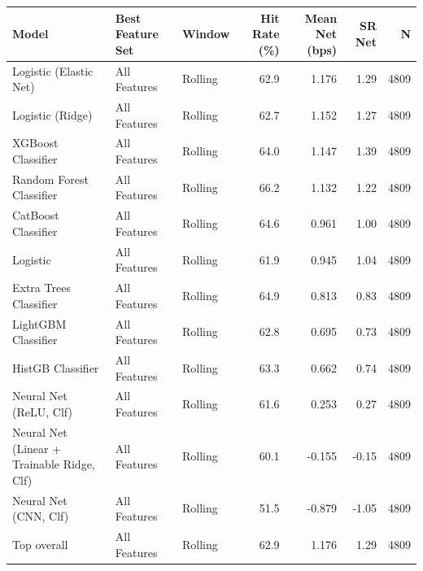 \begin{tabular}{lllrrrr}
\toprule
Model & Best Feature Set & Window & Hit Rate (\%) & Mean Net (bps) & SR Net & N \\
\midrule
Logistic (Elastic Net) & All Features & Rolling & 62.9 & 1.176 & 1.29 & 4809 \\
Logistic (Ridge) & All Features & Rolling & 62.7 & 1.152 & 1.27 & 4809 \\
XGBoost Classifier & All Features & Rolling & 64.0 & 1.147 & 1.39 & 4809 \\
Random Forest Classifier & All Features & Rolling & 66.2 & 1.132 & 1.22 & 4809 \\
CatBoost Classifier & All Features & Rolling & 64.6 & 0.961 & 1.00 & 4809 \\
Logistic & All Features & Rolling & 61.9 & 0.945 & 1.04 & 4809 \\
Extra Trees Classifier & All Features & Rolling & 64.9 & 0.813 & 0.83 & 4809 \\
LightGBM Classifier & All Features & Rolling & 62.8 & 0.695 & 0.73 & 4809 \\
HistGB Classifier & All Features & Rolling & 63.3 & 0.662 & 0.74 & 4809 \\
Neural Net (ReLU, Clf) & All Features & Rolling & 61.6 & 0.253 & 0.27 & 4809 \\
Neural Net (Linear + Trainable Ridge, Clf) & All Features & Rolling & 60.1 & -0.155 & -0.15 & 4809 \\
Neural Net (CNN, Clf) & All Features & Rolling & 51.5 & -0.879 & -1.05 & 4809 \\
\midrule
Top overall & All Features & Rolling & 62.9 & 1.176 & 1.29 & 4809 \\
\bottomrule
\end{tabular}
